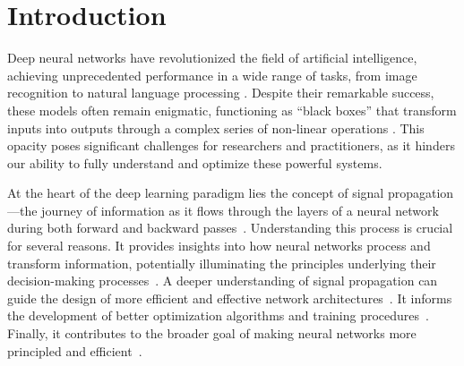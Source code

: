 \chapter{Introduction}

Deep neural networks have revolutionized the field of artificial intelligence, achieving unprecedented performance in a wide range of tasks, from image recognition \cite{krizhevsky2012imagenet} to natural language processing \cite{devlin2018bert}. Despite their remarkable success, these models often remain enigmatic, functioning as ``black boxes'' that transform inputs into outputs through a complex series of non-linear operations \cite{}. This opacity poses significant challenges for researchers and practitioners, as it hinders our ability to fully understand and optimize these powerful systems\cite{}.

At the heart of the deep learning paradigm lies the concept of signal propagation—the journey of information as it flows through the layers of a neural network during both forward and backward passes~\cite{glorot2010understanding}. Understanding this process is crucial for several reasons. It provides insights into how neural networks process and transform information, potentially illuminating the principles underlying their decision-making processes~\cite{zeiler2014visualizing}. A deeper understanding of signal propagation can guide the design of more efficient and effective network architectures~\cite{he2016deep}. It informs the development of better optimization algorithms and training procedures~\cite{kingma2014adam}. Finally, it contributes to the broader goal of making neural networks more principled and efficient~\cite{}.